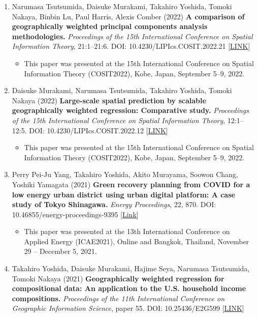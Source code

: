 \documentclass[
]{book}
\providecommand{\tightlist}{%
  \setlength{\itemsep}{0pt}\setlength{\parskip}{0pt}}
\begin{document}
\begin{enumerate}
\def\labelenumi{\arabic{enumi}.}
\tightlist
\item
  Narumasa Tsutsumida, Daisuke Murakami, Takahiro Yoshida, Tomoki Nakaya, Binbin Lu, Paul Harris, Alexis Comber (2022)
  \textbf{A comparison of geographically weighted principal components analysis methodologies.}
  \emph{Proceedings of the 15th International Conference on Spatial Information Theory}, 21:1--21:6.
  DOI: 10.4230/LIPIcs.COSIT.2022.21 {[}\href{https://doi.org/10.4230/LIPIcs.COSIT.2022.21}{LINK}{]}

  \begin{itemize}
  \tightlist
  \item
    This paper was presented at the 15th International Conference on Spatial Information Theory (COSIT2022), Kobe, Japan, September 5--9, 2022.
  \end{itemize}
\item
  Daisuke Murakami, Narumasa Tsutsumida, Takahiro Yoshida, Tomoki Nakaya (2022)
  \textbf{Large-scale spatial prediction by scalable geographically weighted regression: Comparative study.}
  \emph{Proceedings of the 15th International Conference on Spatial Information Theory}, 12:1--12:5.
  DOI: 10.4230/LIPIcs.COSIT.2022.12 {[}\href{https://doi.org/10.4230/LIPIcs.COSIT.2022.12}{LINK}{]}

  \begin{itemize}
  \tightlist
  \item
    This paper was presented at the 15th International Conference on Spatial Information Theory (COSIT2022), Kobe, Japan, September 5--9, 2022.
  \end{itemize}
\item
  Perry Pei-Ju Yang, Takahiro Yoshida, Akito Murayama, Soowon Chang, Yoshiki Yamagata (2021)
  \textbf{Green recovery planning from COVID for a low energy urban district using urban digital platform: A case study of Tokyo Shinagawa.}
  \emph{Energy Proceedings}, 22, 870.
  DOI: 10.46855/energy-proceedings-9395 {[}\href{https://doi.org/10.46855/energy-proceedings-9395}{Link}{]}

  \begin{itemize}
  \tightlist
  \item
    This paper was presented at the 13th International Conference on Applied Energy (ICAE2021), Online and Bangkok, Thailand, November 29 -- December 5, 2021.
  \end{itemize}
\item
  Takahiro Yoshida, Daisuke Murakami, Hajime Seya, Narumasa Tsutsumida, Tomoki Nakaya (2021)
  \textbf{Geographically weighted regression for compositional data: An application to the U.S. household income compositions.}
  \emph{Proceedings of the 11th International Conference on Geographic Information Science}, paper 55.
  DOI: 10.25436/E2G599 {[}\href{https://escholarship.org/uc/item/62s7n79k}{LINK}{]}


\end{enumerate}
\end{document}
